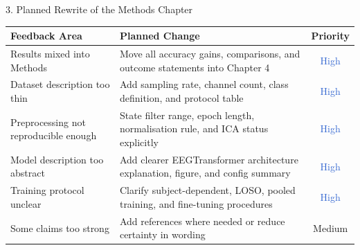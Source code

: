 \documentclass[aspectratio=169, 11pt]{beamer}
\begin{document}
\begin{frame}[shrink=7]{3. Planned Rewrite of the Methods Chapter}

    \begin{table}
        \centering
        \small
        \begin{tabular}{p{4.2cm}p{6.3cm}c}
            \toprule
            \textbf{Feedback Area} & \textbf{Planned Change} & \textbf{Priority} \\
            \midrule
            Results mixed into Methods
            & Move all accuracy gains, comparisons, and outcome statements into Chapter 4
            & \textcolor{highlight}{High} \\
            Dataset description too thin
            & Add sampling rate, channel count, class definition, and protocol table
            & \textcolor{highlight}{High} \\
            Preprocessing not reproducible enough
            & State filter range, epoch length, normalisation rule, and ICA status explicitly
            & \textcolor{highlight}{High} \\
            Model description too abstract
            & Add clearer EEGTransformer architecture explanation, figure, and config summary
            & \textcolor{highlight}{High} \\
            Training protocol unclear
            & Clarify subject-dependent, LOSO, pooled training, and fine-tuning procedures
            & \textcolor{highlight}{High} \\
            Some claims too strong
            & Add references where needed or reduce certainty in wording
            & \textcolor{inprogress}{Medium} \\
            \bottomrule
        \end{tabular}
    \end{table}
\end{frame}
\end{document}
